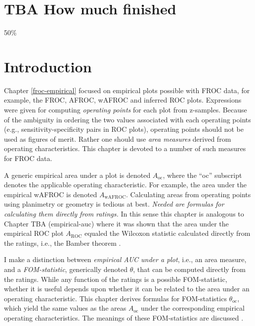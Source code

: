 \documentclass[
]{book}
\begin{document}
\hypertarget{froc-meanings-how-much-finished}{%
\section{TBA How much finished}\label{froc-meanings-how-much-finished}}

50\%

\hypertarget{froc-meanings-intro}{%
\section{Introduction}\label{froc-meanings-intro}}

Chapter \ref{froc-empirical} focused on empirical plots possible with FROC data, for example, the FROC, AFROC, wAFROC and inferred ROC plots. Expressions were given for computing \emph{operating points} for each plot from z-samples. Because of the ambiguity in ordering the two values associated with each operating points (e.g., sensitivity-specificity pairs in ROC plots), operating points should not be used as figures of merit. Rather one should use \emph{area measures} derived from operating characteristics. This chapter is devoted to a number of such measures for FROC data.

A generic empirical area under a plot is denoted \(A_{\text{oc}}\), where the ``oc'' subscript denotes the applicable operating characteristic. For example, the area under the empirical wAFROC is denoted \(A_{\text{wAFROC}}\). Calculating areas from operating points using planimetry or geometry is tedious at best. \emph{Needed are formulas for calculating them directly from ratings.} In this sense this chapter is analogous to Chapter TBA (empirical-auc) where it was shown that the area under the empirical ROC plot \(A_{\text{ROC}}\) equaled the Wilcoxon statistic calculated directly from the ratings, i.e., the Bamber theorem \citep{RN2174}.

I make a distinction between \emph{empirical AUC under a plot}, i.e., an area measure, and a \emph{FOM-statistic}, generically denoted \(\theta\), that can be computed directly from the ratings. While any function of the ratings is a possible FOM-statistic, whether it is useful depends upon whether it can be related to the area under an operating characteristic. This chapter derives formulas for FOM-statistics \(\theta_{\text{oc}}\), which yield the same values as the areas \(A_{\text{oc}}\) under the corresponding empirical operating characteristics. The meanings of these FOM-statistics are discussed \citep{RN2484}.
\end{document}
